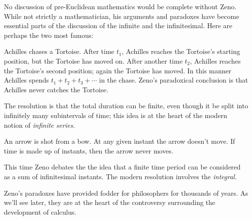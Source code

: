 \label{pg:zeno}

No discussion of pre-Euclidean mathematics would be complete without Zeno. While not strictly a mathematician, his arguments and paradoxes have become essential parts of the discussion of the infinite and the infinitesimal. Here are perhaps the two most famous:
\begin{description}\itemsep0pt
  \item[\normalfont\emph{Achilles and Tortoise}] Achilles chases a Tortoise. After time $t_1$, Achilles reaches the Tortoise's starting position, but the Tortoise has moved on. After another time $t_2$, Achilles reaches the Tortoise's second position; again the Tortoise has moved. In this manner Achilles spends $t_1+t_2+t_3+\cdots$ in the chase. Zeno's paradoxical conclusion is that Achilles never catches the Tortoise.\par
  The resolution is that the total duration can be finite, even though it be split into infinitely many subintervals of time; this idea is at the heart of the modern notion of \emph{infinite series.}
  \item[\normalfont\emph{Arrow paradox}] An arrow is shot from a bow. At any given instant the arrow doesn't move. If time is made up of instants, then the arrow never moves.\par
  This time Zeno debates the the idea that a finite time period can be considered as a sum of infinitesimal instants. The modern resolution involves the \emph{integral.}
\end{description}

Zeno's paradoxes have provided fodder for philosophers for thousands of years. As we'll see later, they are at the heart of the controversy surrounding the development of calculus.%


\label{pg:construction}

